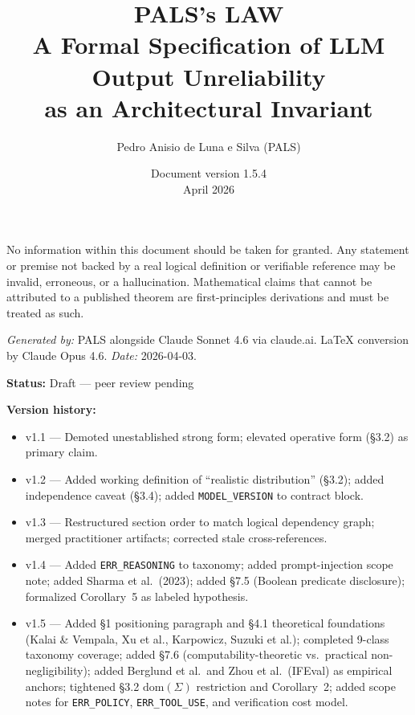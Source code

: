 \documentclass[11pt,a4paper]{article}
\title{%
  \textbf{PALS's LAW}\\[0.3em]
  \Large A Formal Specification of LLM Output Unreliability\\
  as an Architectural Invariant%
}
\author{Pedro Anisio de Luna e Silva (PALS)}
\date{Document version 1.5.4 \\ April 2026}
\begin{document}
\maketitle
\thispagestyle{fancy}

\begin{disclaimer}
No information within this document should be taken for granted.
Any statement or premise not backed by a real logical definition
or verifiable reference may be invalid, erroneous, or a hallucination.
Mathematical claims that cannot be attributed to a published theorem
are first-principles derivations and must be treated as such.

\medskip
\noindent\textit{Generated by:} PALS alongside Claude Sonnet 4.6 via claude.ai.
LaTeX conversion by Claude Opus 4.6. \textit{Date:} 2026-04-03.
\end{disclaimer}

\noindent\textbf{Status:} Draft --- peer review pending

\noindent\textbf{Version history:}
\begin{itemize}[nosep,leftmargin=2em]
  \item v1.1 --- Demoted unestablished strong form; elevated operative form (\S3.2) as primary claim.
  \item v1.2 --- Added working definition of ``realistic distribution'' (\S3.2); added independence caveat (\S3.4); added \texttt{MODEL\_VERSION} to contract block.
  \item v1.3 --- Restructured section order to match logical dependency graph; merged practitioner artifacts; corrected stale cross-references.
  \item v1.4 --- Added \texttt{ERR\_REASONING} to taxonomy; added prompt-injection scope note; added Sharma et al.\ (2023); added \S7.5 (Boolean predicate disclosure); formalized Corollary~5 as labeled hypothesis.
  \item v1.5 --- Added \S1 positioning paragraph and \S4.1 theoretical foundations (Kalai \& Vempala, Xu et al., Karpowicz, Suzuki et al.); completed 9-class taxonomy coverage; added \S7.6 (computability-theoretic vs.\ practical non-negligibility); added Berglund et al.\ and Zhou et al.\ (IFEval) as empirical anchors; tightened \S3.2 $\text{dom}(\Sigma)$ restriction and Corollary~2; added scope notes for \texttt{ERR\_POLICY}, \texttt{ERR\_TOOL\_USE}, and verification cost model.
\end{itemize}

\tableofcontents

\end{document}
